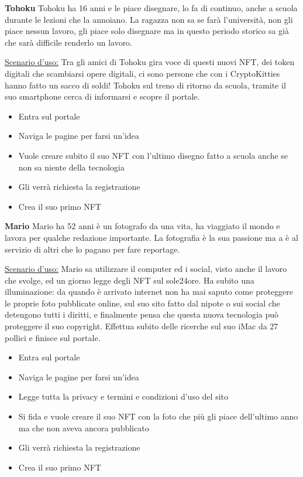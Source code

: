 \bigbreak
\noindent
\textbf{Tohoku}
\bigbreak
\noindent
Tohoku ha 16 anni e le piace disegnare, lo fa di continuo, anche a scuola durante le lezioni che la annoiano.
La ragazza non sa se farà l'università, non gli piace nessun lavoro, gli piace solo disegnare
ma in questo periodo storico sa già che sarà difficile renderlo un lavoro.

\underline{Scenario d'uso:}
Tra gli amici di Tohoku gira voce di questi nuovi NFT, dei token digitali che scambiarsi opere digitali,
ci sono persone che con i CryptoKitties hanno fatto un sacco di soldi! 
Tohoku sul treno di ritorno da scuola, tramite il suo smartphone cerca di informarsi e scopre il portale.

\begin{itemize}
	\item Entra sul portale
	\item Naviga le pagine per farsi un'idea
	\item Vuole creare subito il suo NFT con l'ultimo disegno fatto a scuola anche se non sa niente della tecnologia
	\item Gli verrà richiesta la registrazione
	\item Crea il suo primo NFT
\end{itemize}

\bigbreak
\noindent
\textbf{Mario}
\bigbreak
\noindent
Mario ha 52 anni è un fotografo da una vita, ha viaggiato il mondo e lavora per qualche redazione importante.
La fotografia è la sua passione ma a è al servizio di altri che lo pagano per fare reportage.

\underline{Scenario d'uso:}
Mario sa utilizzare il computer ed i social, visto anche il lavoro che svolge, ed un giorno legge degli NFT sul sole24ore.
Ha subito una illuminazione: da quando è arrivato internet non ha mai saputo come proteggere le proprie foto pubblicate online, 
sul suo sito fatto dal nipote o sui social che detengono tutti i diritti, e finalmente pensa che questa nuova tecnologia può proteggere il suo copyright.
Effettua subito delle ricerche sul suo iMac da 27 pollici e finisce sul portale.

\begin{itemize}
	\item Entra sul portale
	\item Naviga le pagine per farsi un'idea
	\item Legge tutta la privacy e termini e condizioni d'uso del sito
	\item Si fida e vuole creare il suo NFT con la foto che più gli piace dell'ultimo anno ma che non aveva ancora pubblicato
	\item Gli verrà richiesta la registrazione
	\item Crea il suo primo NFT
\end{itemize}

